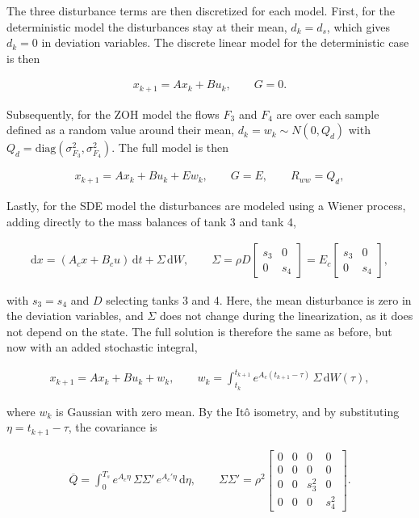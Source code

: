 The three disturbance terms are then discretized for each model. First, for the deterministic model the disturbances stay at their mean, $d_k=d_s$, which gives $d_k=0$ in deviation variables. The discrete linear model for the deterministic case is then

\begin{align}
  x_{k+1} = Ax_k + Bu_k, \qquad G = 0 .
\end{align}

Subsequently, for the ZOH model the flows $F_3$ and $F_4$ are over each sample defined as a random value around their mean, $d_k = w_k \sim N(0,Q_d)$ with $Q_d = \mathrm{diag}(\sigma^2_{F_3}, \sigma^2_{F_4})$. The full model is then

\begin{align}
  x_{k+1} = Ax_k + Bu_k + Ew_k, \qquad G = E, \qquad R_{ww} = Q_d,
\end{align}

Lastly, for the SDE model the disturbances are modeled using a Wiener process, adding directly to the mass balances of tank 3 and tank 4,

\begin{align}
  \mathrm{d}x = (A_cx + B_cu)\,\mathrm{d}t + \Sigma\,\mathrm{d}W, \qquad
  \Sigma = \rho D\begin{bmatrix} s_3 & 0 \\ 0 & s_4 \end{bmatrix}
         = E_c \begin{bmatrix} s_3 & 0 \\ 0 & s_4 \end{bmatrix},
\end{align}

with $s_3=s_4$ and $D$ selecting tanks 3 and 4. Here, the mean disturbance is zero in the deviation variables, and $\Sigma$ does not change during the linearization, as it does not depend on the state. The full solution is therefore the same as before, but now with an added stochastic integral,

\begin{align}
  x_{k+1} = Ax_k + Bu_k + w_k, \qquad
  w_k = \int_{t_k}^{t_{k+1}} e^{A_c(t_{k+1}-\tau)}\,\Sigma\,\mathrm{d}W(\tau),
\end{align}

where $w_k$ is Gaussian with zero mean. By the It\^o isometry, and by substituting $\eta = t_{k+1}-\tau$, the covariance is

\begin{align}
  \overline{Q} = \int_0^{T_s} e^{A_c\eta}\,\Sigma\Sigma'\,e^{A_c'\eta}\,\mathrm{d}\eta,
  \qquad \Sigma\Sigma' = \rho^2 \begin{bmatrix}
    0 & 0 & 0 & 0 \\
    0 & 0 & 0 & 0 \\
    0 & 0 & s_3^2 & 0 \\
    0 & 0 & 0 & s_4^2
  \end{bmatrix}.
\end{align}

